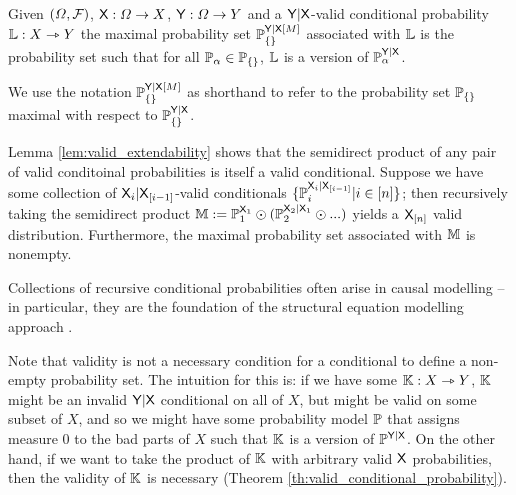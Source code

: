 \begin{definition}
Given $(\Omega,\mathcal{F})$, $\mathsf{X}:\Omega\to X$, $\mathsf{Y}:\Omega\to Y$ and a $\mathsf{Y}|\mathsf{X}$-valid conditional probability $\mathbb{L}:X\rightarrowtriangle Y$ the maximal probability set $\mathbb{P}_{\{\}}^{\mathsf{Y}|\mathsf{X}[M]}$ associated with $\mathbb{L}$ is the probability set such that for all $\mathbb{P}_\alpha\in \mathbb{P}_{\{\}}$, $\mathbb{L}$ is a version of $\mathbb{P}_\alpha^{\mathsf{Y}|\mathsf{X}}$.
\end{definition}

We use the notation $\mathbb{P}_{\{\}}^{\mathsf{Y}|\mathsf{X}[M]}$ as shorthand to refer to the probability set $\mathbb{P}_{\{\}}$ maximal with respect to $\mathbb{P}_{\{\}}^{\mathsf{Y}|\mathsf{X}}$.

Lemma \ref{lem:valid_extendability} shows that the semidirect product of any pair of valid conditoinal probabilities is itself a valid conditional. Suppose we have some collection of $\mathsf{X}_i|\mathsf{X}_{[i-1]}$-valid conditionals $\{\mathbb{P}_i^{\mathsf{X}_i|\mathsf{X}_{[i-1]}}|i\in [n]\}$; then recursively taking the semidirect product $\mathbb{M}:=\mathbb{P}_1^{\mathsf{X}_1}\odot (\mathbb{P}_2^{\mathsf{X}_2|\mathsf{X}_{1}}\odot ...)$ yields a $\mathsf{X}_{[n]}$ valid distribution. Furthermore, the maximal probability set associated with $\mathbb{M}$ is nonempty.

Collections of recursive conditional probabilities often arise in causal modelling -- in particular, they are the foundation of the structural equation modelling approach \citet{richardson2013single,pearl_causality:_2009}.

Note that validity is not a necessary condition for a conditional to define a non-empty probability set. The intuition for this is: if we have some $\mathbb{K}:X\rightarrowtriangle Y$, $\mathbb{K}$ might be an invalid $\mathsf{Y}|\mathsf{X}$ conditional on all of $X$, but might be valid on some subset of $X$, and so we might have some probability model $\mathbb{P}$ that assigns measure 0 to the bad parts of $X$ such that $\mathbb{K}$ is a version of $\mathbb{P}^{\mathsf{Y}|\mathsf{X}}$. On the other hand, if we want to take the product of $\mathbb{K}$ with arbitrary valid $\mathsf{X}$ probabilities, then the validity of $\mathbb{K}$ is necessary (Theorem \ref{th:valid_conditional_probability}).

